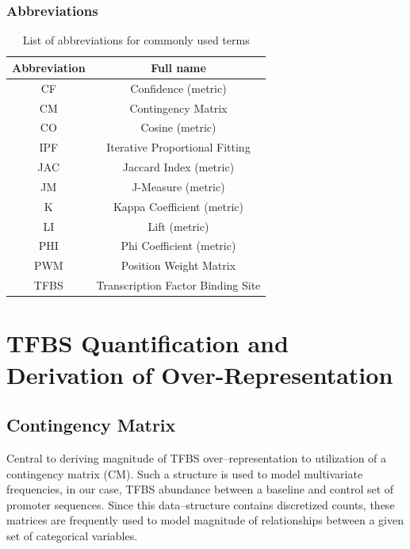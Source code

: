 \documentclass{article}
\begin{document}
\subsubsection{Abbreviations}
\begin{table}[htbc]
	\centering
	\begin{tabular}{c | c }
	\hline Abbreviation & Full name \\ \hline
	CF & Confidence (metric) \\
	CM & Contingency Matrix \\
	CO & Cosine (metric)\\
	IPF & Iterative Proportional Fitting \\
	JAC & Jaccard Index (metric) \\
	JM & J-Measure (metric) \\
	K & Kappa Coefficient (metric) \\
	LI & Lift (metric) \\
	PHI & Phi Coefficient (metric) \\
	PWM & Position Weight Matrix \\
	TFBS & Transcription Factor Binding Site \\
	\end{tabular}
	\caption{List of abbreviations for commonly used terms}
	\label{table:abbreviations}
\end{table}

\section{TFBS Quantification and Derivation of Over-Representation}

\subsection{Contingency Matrix}
Central to deriving magnitude of TFBS over--representation to utilization of 
a contingency matrix (CM).
Such a structure is used to model
multivariate frequencies, in our case, TFBS abundance between a baseline and
control set of promoter sequences. Since this data--structure contains discretized counts, these
matrices are frequently used to model magnitude of relationships between a given
set of categorical variables.
\end{document}
